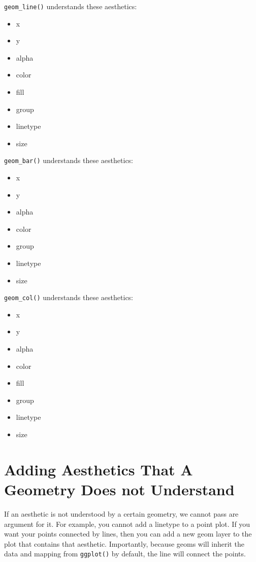 \documentclass[
  letterpaper,
  DIV=11,
  numbers=noendperiod]{scrartcl}
\providecommand{\tightlist}{%
  \setlength{\itemsep}{0pt}\setlength{\parskip}{0pt}}\usepackage{longtable,booktabs,array}
\begin{document}
\texttt{geom\_line()} understands these aesthetics:

\begin{itemize}
\tightlist
\item
  x
\item
  y
\item
  alpha
\item
  color
\item
  fill
\item
  group
\item
  linetype
\item
  size
\end{itemize}

\texttt{geom\_bar()} understands these aesthetics:

\begin{itemize}
\tightlist
\item
  x
\item
  y
\item
  alpha
\item
  color
\item
  group
\item
  linetype
\item
  size
\end{itemize}

\texttt{geom\_col()} understands these aesthetics:

\begin{itemize}
\tightlist
\item
  x
\item
  y
\item
  alpha
\item
  color
\item
  fill
\item
  group
\item
  linetype
\item
  size
\end{itemize}

\hypertarget{adding-aesthetics-that-a-geometry-does-not-understand}{%
\section{\texorpdfstring{\textbf{Adding Aesthetics That A Geometry Does
not
Understand}}{Adding Aesthetics That A Geometry Does not Understand}}\label{adding-aesthetics-that-a-geometry-does-not-understand}}

If an aesthetic is not understood by a certain geometry, we cannot pass
are argument for it. For example, you cannot add a linetype to a point
plot. If you want your points connected by lines, then you can add a new
geom layer to the plot that contains that aesthetic. Importantly,
because geoms will inherit the data and mapping from \texttt{ggplot()}
by default, the line will connect the points.
\end{document}
